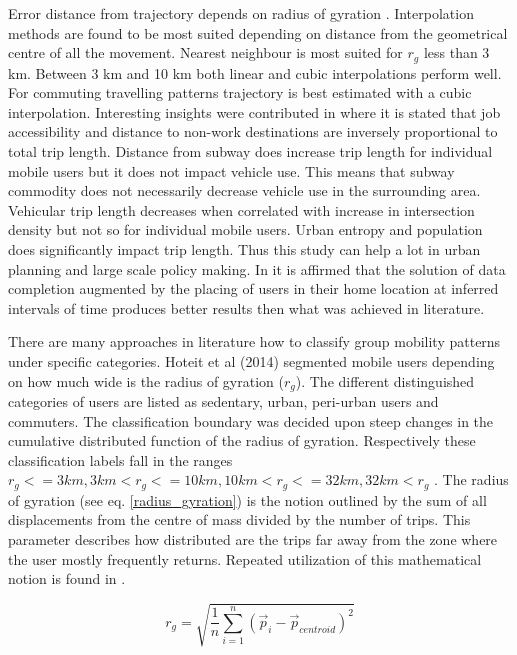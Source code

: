 \documentclass[12pt, a4paper]{report}
\theoremstyle{definition}
\theoremstyle{definition}%
\theoremstyle{definition}%
\theoremstyle{definition}%
\theoremstyle{definition}%
\theoremstyle{definition}%
\begin{document}
Error distance from trajectory depends on radius of gyration \cite{Hoteit2014}. Interpolation methods are found to be most suited depending on distance from the geometrical centre of all the movement. Nearest neighbour is most suited for $r_{g}$ less than 3 km. Between 3 km and 10 km both linear and cubic interpolations perform well. For commuting travelling patterns trajectory is best estimated with a cubic interpolation.
Interesting insights were contributed in \cite{Calabrese2013} where it is stated that job accessibility and distance to non-work destinations are inversely proportional to total trip length. Distance from subway does increase trip length for individual mobile users but it does not impact vehicle use. This means that subway commodity does not necessarily decrease vehicle use in the surrounding area. Vehicular trip length decreases when correlated with increase in intersection density but not so for individual mobile users. Urban entropy and population does significantly impact trip length. Thus this study can help a lot in urban planning and large scale policy making.
In \cite{Hoteit2016} it is affirmed that the solution of data completion augmented by the placing of users in their home location at inferred intervals of time produces better results then what was achieved in literature.

There are many approaches in literature how to classify group mobility patterns under specific categories. Hoteit et al (2014) segmented mobile users depending on how much wide is the radius of gyration (\(r_{g}\)). The different distinguished categories of users are listed as sedentary, urban, peri-urban users and commuters. The classification boundary was decided upon steep changes in the cumulative distributed function of the radius of gyration. Respectively these classification labels fall in the ranges \(r_{g} <= 3km, 3km < r_{g} <= 10km, 10km < r_{g} <= 32km, 32km < r_{g}\) \cite{Hoteit2014}. The radius of gyration (see eq. \ref{radius_gyration}) is the notion outlined by the sum of all displacements from the centre of mass divided by the number of trips. This parameter describes how distributed are the trips far away from the zone where the user mostly frequently returns. Repeated utilization of this mathematical notion is found in \cite{Hoteit2014,Gonzalez2008,Hoteit2016}.

\begin{equation} \label{radius_gyration}
r_{g} = \sqrt{\frac{1}{n}\sum _{i=1}^{n}({\stackrel{\to }{p}}_{i}-{\stackrel{\to }{p}}_{centroid})^2}
\end{equation}
\end{document}
